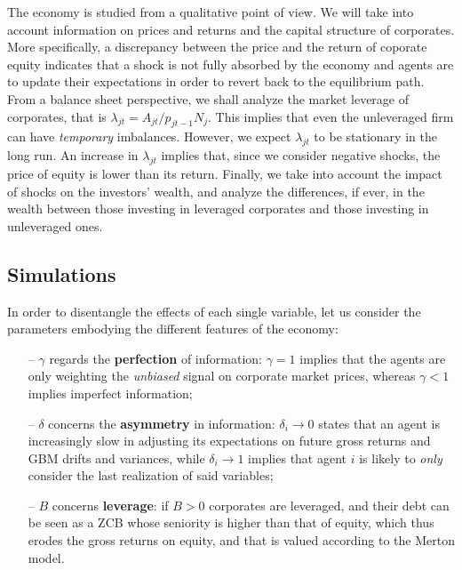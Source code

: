 \documentclass[11pt]{article}
\begin{document}
The economy is studied from a qualitative point of view. We will take into account information on prices and returns and the capital structure of corporates. More specifically, a discrepancy between the price and the return of coporate equity indicates that a shock is not fully absorbed by the economy and agents are to update their expectations in order to revert back to the equilibrium path. From a balance sheet perspective, we shall analyze the market leverage of corporates, that is $\lambda_{jt}=A_{jt}/p_{jt-1}N_j$. This implies that even the unleveraged firm can have \emph{temporary} imbalances. However, we expect $\lambda_{jt}$ to be stationary in the long run. An increase in $\lambda_{jt}$ implies that, since we consider negative shocks, the price of equity is lower than its return. Finally, we take into account the impact of shocks on the investors' wealth, and analyze the differences, if ever, in the wealth between those investing in leveraged corporates and those investing in unleveraged ones.
\subsection{Simulations}
In order to disentangle the effects of each single variable, let us consider the parameters embodying the different features of the economy:
\begin{itemize}
	\item[--] $\gamma$ regards the \textbf{perfection} of information: $\gamma=1$ implies that the agents are only weighting the \emph{unbiased} signal on corporate market prices, whereas $\gamma < 1$ implies imperfect information;
	\item[--] $\delta$ concerns the \textbf{asymmetry} in information: $\delta_i \to 0$ states that an agent is increasingly slow in adjusting its expectations on future gross returns and GBM drifts and variances, while $\delta_i \to 1$ implies that agent $i$ is likely to \emph{only} consider the last realization of said variables;
	\item[--] $B$ concerns \textbf{leverage}: if $B>0$ corporates are leveraged, and their debt can be seen as a ZCB whose seniority is higher than that of equity, which thus erodes the gross returns on equity, and that is valued according to the Merton model.
\end{itemize}
\end{document}

